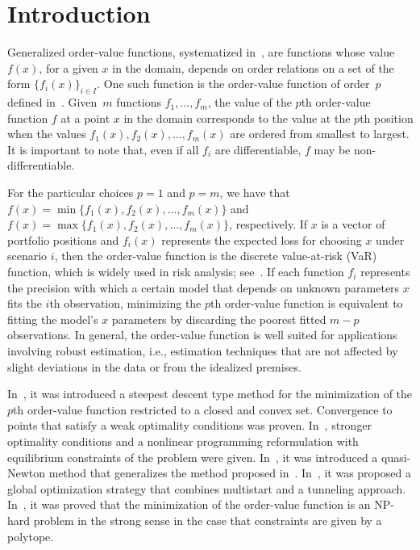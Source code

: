 \documentclass[11pt]{article}
\begin{document}
\section{Introduction} \label{sec:intro}

Generalized order-value functions, systematized in~\cite{mtop}, are functions whose value~$f(x)$, for a given $x$ in the domain, depends on order relations on a set of the form $\{f_i(x)\}_{i \in I}$. One such function is the order-value function of order~$p$ defined in~\cite{dunder1,dunder2}. Given~$m$ functions $f_1,\dots,f_m$, the value of the $p$th order-value function $f$ at a point $x$ in the domain corresponds to the value at the $p$th position when the values $f_1(x), f_2(x), \dots, f_m(x)$ are ordered from smallest to largest. It is important to note that, even if all $f_i$ are differentiable, $f$ may be non-differentiable.

For the particular choices $p=1$ and $p=m$, we have that $f(x)=\min\{ f_1(x), f_2(x), \dots, f_m(x)\}$ and $f(x)=\max\{ f_1(x), f_2(x), \dots, f_m(x)\}$, respectively. If $x$ is a vector of portfolio positions and $f_i(x)$ represents the expected loss for choosing $x$ under scenario $i$, then the order-value function is the discrete value-at-risk (VaR) function, which is widely used in risk analysis; see~\cite{jorion}. If each function $f_i$ represents the precision with which a certain model that depends on unknown parameters $x$ fits the $i$th observation, minimizing the $p$th order-value function is equivalent to fitting the model's $x$ parameters by discarding the poorest fitted $m-p$ observations. In general, the order-value function is well suited for applications involving robust estimation, i.e., estimation techniques that are not affected by slight deviations in the data or from the idealized premises.

In~\cite{dunder1}, it was introduced a steepest descent type method for the minimization of the $p$th order-value function restricted to a closed and convex set. Convergence to points that satisfy a weak optimality conditions was proven. In~\cite{dunder2}, stronger optimality conditions and a nonlinear programming reformulation with equilibrium constraints of the problem were given. In~\cite{yano1}, it was introduced a quasi-Newton method that generalizes the method proposed in~\cite{dunder1}. In~\cite{salva}, it was proposed a global optimization strategy that combines multistart and a tunneling approach. In~\cite{jiang}, it was proved that the minimization of the order-value function is an NP-hard problem in the strong sense in the case that constraints are given by a polytope.
\end{document}
